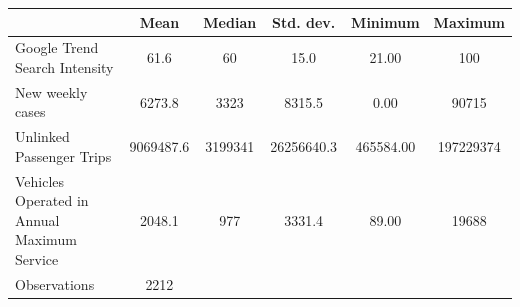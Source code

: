 {
\def\sym#1{\ifmmode^{#1}\else\(^{#1}\)\fi}
\begin{tabular}{l*{1}{ccccc}}
\toprule
                    &        Mean&      Median&   Std. dev.&     Minimum&     Maximum\\
\midrule
Google Trend Search Intensity&        61.6&          60&        15.0&       21.00&         100\\
New weekly cases    &      6273.8&        3323&      8315.5&        0.00&       90715\\
Unlinked Passenger Trips&   9069487.6&     3199341&  26256640.3&   465584.00&   197229374\\
Vehicles Operated in Annual Maximum Service&      2048.1&         977&      3331.4&       89.00&       19688\\
\midrule
Observations        &        2212&            &            &            &            \\
\bottomrule
\end{tabular}
}
